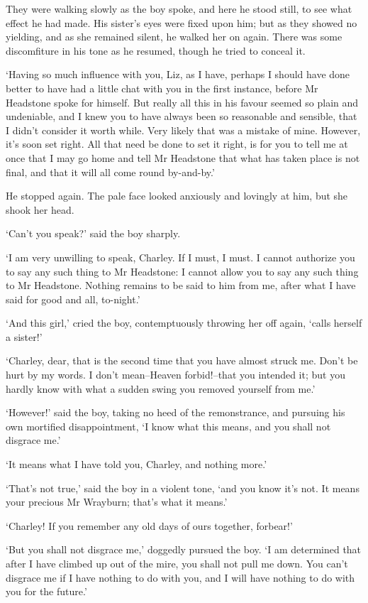 They were walking slowly as the boy spoke, and here he stood still, to
see what effect he had made. His sister’s eyes were fixed upon him; but
as they showed no yielding, and as she remained silent, he walked her on
again. There was some discomfiture in his tone as he resumed, though he
tried to conceal it.

‘Having so much influence with you, Liz, as I have, perhaps I should
have done better to have had a little chat with you in the first
instance, before Mr Headstone spoke for himself. But really all this in
his favour seemed so plain and undeniable, and I knew you to have always
been so reasonable and sensible, that I didn’t consider it worth while.
Very likely that was a mistake of mine. However, it’s soon set right.
All that need be done to set it right, is for you to tell me at once
that I may go home and tell Mr Headstone that what has taken place is
not final, and that it will all come round by-and-by.’

He stopped again. The pale face looked anxiously and lovingly at him,
but she shook her head.

‘Can’t you speak?’ said the boy sharply.

‘I am very unwilling to speak, Charley. If I must, I must. I cannot
authorize you to say any such thing to Mr Headstone: I cannot allow you
to say any such thing to Mr Headstone. Nothing remains to be said to him
from me, after what I have said for good and all, to-night.’

‘And this girl,’ cried the boy, contemptuously throwing her off again,
‘calls herself a sister!’

‘Charley, dear, that is the second time that you have almost struck
me. Don’t be hurt by my words. I don’t mean--Heaven forbid!--that you
intended it; but you hardly know with what a sudden swing you removed
yourself from me.’

‘However!’ said the boy, taking no heed of the remonstrance, and
pursuing his own mortified disappointment, ‘I know what this means, and
you shall not disgrace me.’

‘It means what I have told you, Charley, and nothing more.’

‘That’s not true,’ said the boy in a violent tone, ‘and you know it’s
not. It means your precious Mr Wrayburn; that’s what it means.’

‘Charley! If you remember any old days of ours together, forbear!’

‘But you shall not disgrace me,’ doggedly pursued the boy. ‘I am
determined that after I have climbed up out of the mire, you shall not
pull me down. You can’t disgrace me if I have nothing to do with you,
and I will have nothing to do with you for the future.’

